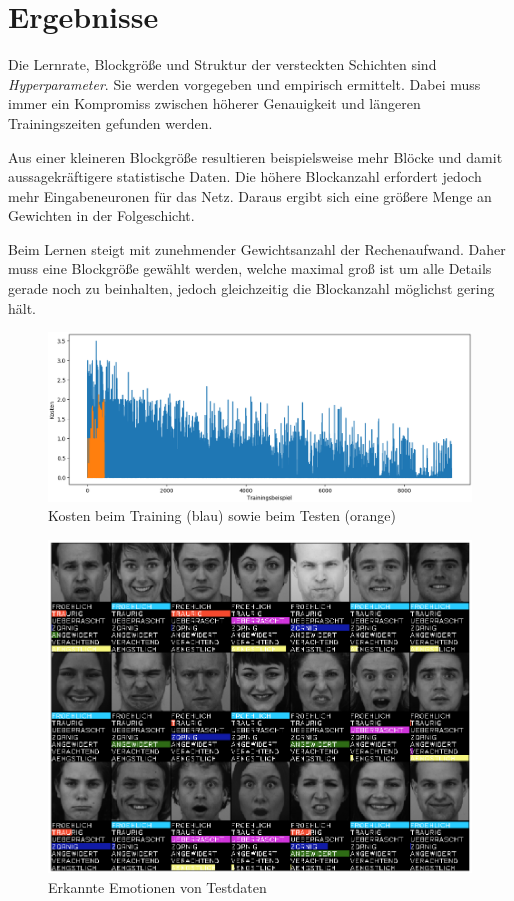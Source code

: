 \documentclass[12pt, a4paper]{article}
\begin{document}
\newpage
\section{Ergebnisse}
Die Lernrate, Blockgröße und Struktur der versteckten Schichten sind \textit{Hyperparameter}. Sie werden vorgegeben und empirisch ermittelt. Dabei muss immer ein Kompromiss zwischen höherer Genauigkeit und längeren Trainingszeiten gefunden werden.

Aus einer kleineren Blockgröße resultieren beispielsweise mehr Blöcke und damit aussagekräftigere statistische Daten. Die höhere Blockanzahl erfordert jedoch mehr Eingabeneuronen für das Netz. Daraus ergibt sich eine größere Menge an Gewichten in der Folgeschicht. 

Beim Lernen steigt mit zunehmender Gewichtsanzahl der Rechenaufwand. Daher muss eine Blockgröße gewählt werden, welche maximal groß ist um alle Details gerade noch zu beinhalten, jedoch gleichzeitig die Blockanzahl möglichst gering hält.

\begin{figure}[p]
	\centering
	\includegraphics[width=1\textwidth]{82_score_costs}
	\caption{Kosten beim Training (blau) sowie beim Testen (orange)}
	\label{fig:costs_best_score}
\end{figure}

\begin{figure}[p]
	\centering
	\includegraphics[width=1\textwidth]{detection_results_2}
	\caption{Erkannte Emotionen von Testdaten}
	\label{fig:emots_best_score}
\end{figure}
\end{document}
